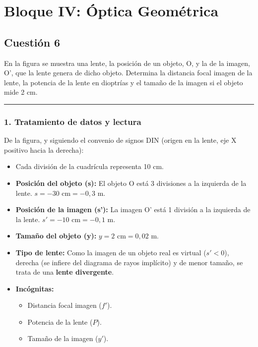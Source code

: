 \newpage

\section{Bloque IV: Óptica Geométrica}
\label{sec:optica_2022_jun_ord}

\subsection{Cuestión 6}
\label{subsec:C6_2022_jun_ord}

\begin{cajaenunciado}
En la figura se muestra una lente, la posición de un objeto, O, y la de la imagen, O', que la lente genera de dicho objeto. Determina la distancia focal imagen de la lente, la potencia de la lente en dioptrías y el tamaño de la imagen si el objeto mide 2 cm. 
\end{cajaenunciado}
\hrule

\subsubsection*{1. Tratamiento de datos y lectura}
De la figura, y siguiendo el convenio de signos DIN (origen en la lente, eje X positivo hacia la derecha):
\begin{itemize}
    \item Cada división de la cuadrícula representa 10 cm.
    \item \textbf{Posición del objeto (s):} El objeto O está 3 divisiones a la izquierda de la lente. $s = -30 \text{ cm} = -0,3 \text{ m}$.
    \item \textbf{Posición de la imagen (s'):} La imagen O' está 1 división a la izquierda de la lente. $s' = -10 \text{ cm} = -0,1 \text{ m}$.
    \item \textbf{Tamaño del objeto (y):} $y = 2 \text{ cm} = 0,02 \text{ m}$.
    \item \textbf{Tipo de lente:} Como la imagen de un objeto real es virtual ($s' < 0$), derecha (se infiere del diagrama de rayos implícito) y de menor tamaño, se trata de una \textbf{lente divergente}.
    \item \textbf{Incógnitas:}
        \begin{itemize}
            \item Distancia focal imagen ($f'$).
            \item Potencia de la lente ($P$).
            \item Tamaño de la imagen ($y'$).
        \end{itemize}
\end{itemize}

